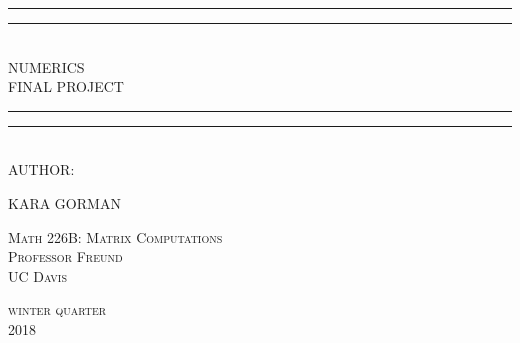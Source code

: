 \documentclass[12pt]{article}
\newlength{\drop} %
\begin{document}

  \begin{titlepage}
    \textheight
    \centering
    \vspace*{\baselineskip}
    \rule{\textwidth}{1.6pt}\vspace*{-\baselineskip}\vspace*{2pt}
    \rule{\textwidth}{0.4pt}\\[\baselineskip]
    {\LARGE NUMERICS\\[0.8\baselineskip] FINAL PROJECT}\\[0.2\baselineskip]
    \rule{\textwidth}{0.4pt}\vspace*{-\baselineskip}\vspace{3.2pt}
    \rule{\textwidth}{1.6pt}\\[\baselineskip]
    {\large\scshape AUTHOR:}\par
    {\large\scshape KARA GORMAN}\par
	\vfill
    \scshape
    Math 226B: Matrix Computations \\
    Professor Freund \\
    UC Davis\par
   \vspace*{2\baselineskip}
    \vfill
    {\large\scshape winter quarter}\\[\baselineskip]
	{\small\scshape 2018}\par
	\vspace*{\drop}
  \end{titlepage}

\newpage
\tableofcontents
{}
\newpage
\lstlistoflistings
\text{ }\\
\listoftables
\text{ }\\
\listoffigures

\newpage

\end{document}
